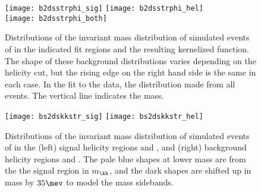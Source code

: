 \begin{figure}
  \begin{center}
    \texttt{[image: b2dsstrphi\_sig]}
    \texttt{[image: b2dsstrphi\_hel]}\\
    \texttt{[image: b2dsstrphi\_both]}
    \caption[Contribution to the \btodsphi fit from the \btodsstrphi background]
    {
      Distributions of the invariant mass distribution of simulated events of \btodsstrphi
      in the indicated fit regions and the resulting kernelized function.
      The shape of these background distributions varies depending on the helicity cut, but the
      rising edge on the right hand side is the same in each case.
      In the fit to the data, the distribution made from all events.
      The vertical line indicates the \Bp mass.
    }
    \label{fig:dsphi:dsstrphi}
  \end{center}
\end{figure}







\begin{figure}
  \begin{center}
    \texttt{[image: bs2dskkstr\_sig]}
    \texttt{[image: bs2dskkstr\_hel]}
    \caption[Shapes of the \bstodskstrk background]
    {
      Distributions of the invariant mass distribution of simulated events of \bstodskstrk in the
      (left) signal helicity regions \rA and \rB, and
      (right) background helicity regions \rC and \rD.
      The pale blue shapes at lower mass are from the the signal region in $m_\kk$, and the dark
      shapes are shifted up in mass by $35\mev$ to model the \phii mass sidebands.
    }
    \label{fig:dsphi:bstodskstrk}
  \end{center}
\end{figure}

